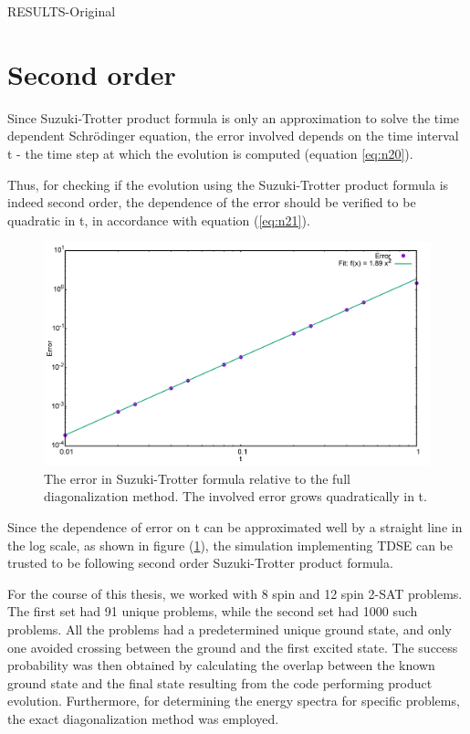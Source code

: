 \documentclass[12]{article}
\begin{document}
\begin{center}
\begin{Huge}
RESULTS-Original
\end{Huge}
\end{center}
\section{Second order}
Since Suzuki-Trotter product formula is only an approximation to solve the time dependent Schr{\"o}dinger equation, the error involved depends on the time interval t - the time step at which the evolution is computed (equation \ref{eq:n20}). 

Thus, for checking if the evolution using the Suzuki-Trotter product formula is indeed second order, the dependence of the error should be verified to be quadratic in t, in accordance with equation (\ref{eq:n21}). 
\begin{figure}[H]
\centering 
\includegraphics[scale=0.3]{Error.png}
\caption{The error in Suzuki-Trotter formula relative to the full diagonalization method. The involved error grows quadratically in t.}
\label{fig:o1}
\end{figure}
Since the dependence of error on t can be approximated well by a straight line in the log scale, as shown in figure (\ref{fig:o1}), the simulation implementing TDSE can be trusted to be following second order Suzuki-Trotter product formula.

For the course of this thesis, we worked with 8 spin and 12 spin 2-SAT problems. The first set had 91 unique problems, while the second set had 1000 such problems. All the problems had a predetermined unique ground state, and only one avoided crossing between the ground and the first excited state. The success probability was then obtained by calculating the overlap between the known ground state and the final state resulting from the code performing product evolution. Furthermore, for determining the energy spectra for specific problems, the exact diagonalization method was employed.
\end{document}
